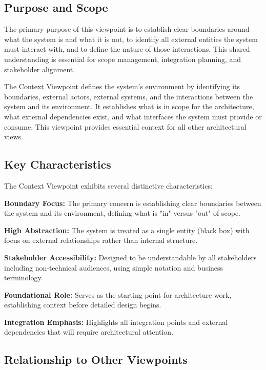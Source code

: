 \documentclass[11pt,letterpaper]{article}
\begin{document}
\subsection{Purpose and Scope}

The primary purpose of this viewpoint is to establish clear boundaries around what the system is and what it is not, to identify all external entities the system must interact with, and to define the nature of those interactions. This shared understanding is essential for scope management, integration planning, and stakeholder alignment.

\begin{definitionbox}
The Context Viewpoint defines the system's environment by identifying its boundaries, external actors, external systems, and the interactions between the system and its environment. It establishes what is in scope for the architecture, what external dependencies exist, and what interfaces the system must provide or consume. This viewpoint provides essential context for all other architectural views.
\end{definitionbox}

\subsection{Key Characteristics}

The Context Viewpoint exhibits several distinctive characteristics:

\textbf{Boundary Focus:} The primary concern is establishing clear boundaries between the system and its environment, defining what is "in" versus "out" of scope.

\textbf{High Abstraction:} The system is treated as a single entity (black box) with focus on external relationships rather than internal structure.

\textbf{Stakeholder Accessibility:} Designed to be understandable by all stakeholders including non-technical audiences, using simple notation and business terminology.

\textbf{Foundational Role:} Serves as the starting point for architecture work, establishing context before detailed design begins.

\textbf{Integration Emphasis:} Highlights all integration points and external dependencies that will require architectural attention.

\subsection{Relationship to Other Viewpoints}
\end{document}
